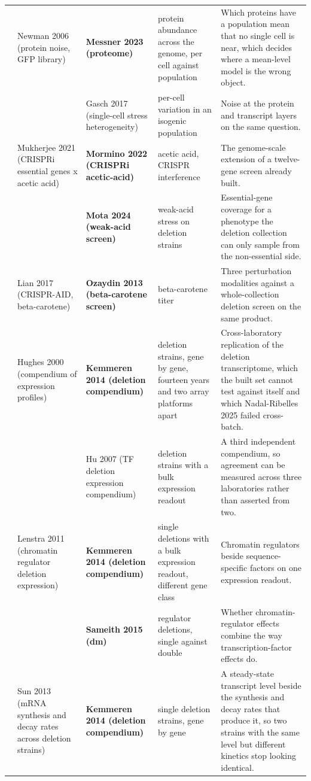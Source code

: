 \begin{landscape}
\begin{longtable}{@{}r@{\hspace{4pt}} L{42mm} L{44mm} L{48mm} L{96mm}@{}}
 & Newman 2006 (protein noise, GFP library) & \textbf{Messner 2023 (proteome)} & protein abundance across the genome, per cell against population & Which proteins have a population mean that no single cell is near, which decides where a mean-level model is the wrong object. \\
 &  & Gasch 2017 (single-cell stress heterogeneity) & per-cell variation in an isogenic population & Noise at the protein and transcript layers on the same question. \\
 & Mukherjee 2021 (CRISPRi essential genes x acetic acid) & \textbf{Mormino 2022 (CRISPRi acetic-acid)} & acetic acid, CRISPR interference & The genome-scale extension of a twelve-gene screen already built. \\
 &  & \textbf{Mota 2024 (weak-acid screen)} & weak-acid stress on deletion strains & Essential-gene coverage for a phenotype the deletion collection can only sample from the non-essential side. \\
 & Lian 2017 (CRISPR-AID, beta-carotene) & \textbf{Ozaydin 2013 (beta-carotene screen)} & beta-carotene titer & Three perturbation modalities against a whole-collection deletion screen on the same product. \\
 & Hughes 2000 (compendium of expression profiles) & \textbf{Kemmeren 2014 (deletion compendium)} & deletion strains, gene by gene, fourteen years and two array platforms apart & Cross-laboratory replication of the deletion transcriptome, which the built set cannot test against itself and which Nadal-Ribelles 2025 failed cross-batch. \\
 &  & Hu 2007 (TF deletion expression compendium) & deletion strains with a bulk expression readout & A third independent compendium, so agreement can be measured across three laboratories rather than asserted from two. \\
 & Lenstra 2011 (chromatin regulator deletion expression) & \textbf{Kemmeren 2014 (deletion compendium)} & single deletions with a bulk expression readout, different gene class & Chromatin regulators beside sequence-specific factors on one expression readout. \\
 &  & \textbf{Sameith 2015 (dm)} & regulator deletions, single against double & Whether chromatin-regulator effects combine the way transcription-factor effects do. \\
 & Sun 2013 (mRNA synthesis and decay rates across deletion strains) & \textbf{Kemmeren 2014 (deletion compendium)} & single deletion strains, gene by gene & A steady-state transcript level beside the synthesis and decay rates that produce it, so two strains with the same level but different kinetics stop looking identical. \\

\end{longtable}
\end{landscape}
